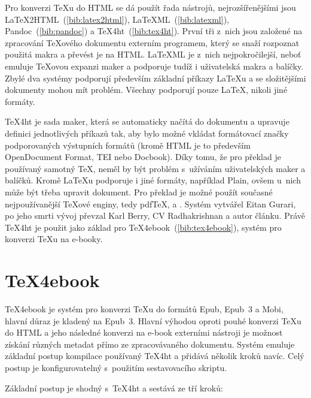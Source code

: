\documentclass{csbulletin}
\renewcommand\cite[1]{(\ref{#1})}
\begin{document}
Pro konverzi \TeX u do HTML se dá použít řada nástrojů, nejrozšířenějšími jsou
LaTeX2HTML~\cite{bib:latex2html},
LaTeXML~\cite{bib:latexml},
Pandoc~\cite{bib:pandoc} a
\TeX{}4ht~\cite{bib:tex4ht}. První tři z~nich jsou založené na
zpracování \TeX ového dokumentu externím programem, který se snaží rozpoznat
použitá makra a převést je na HTML. LaTeXML je z~nich nejpokročilejší, neboť 
emuluje \TeX ovou expanzi maker a podporuje tudíž i uživatelská makra a
balíčky. Zbylé dva systémy podporují především základní příkazy \LaTeX u a se
složitějšími dokumenty mohou mít problém. Všechny podporují pouze \LaTeX,
nikoli jiné formáty. 

\TeX{}4ht je sada maker, která se automaticky načítá do dokumentu a upravuje
definici jednotlivých příkazů tak, aby bylo možné vkládat formátovací značky
podporovaných výstupních formátů (kromě HTML je to především OpenDocument
Format, TEI nebo Docbook). Díky tomu, že pro překlad je používaný samotný \TeX,
neměl by být problém s~užíváním uživatelských maker a balíčků. Kromě \LaTeX u
podporuje i jiné formáty, například Plain, ovšem u~nich může být třeba upravit
dokument. Pro překlad je možné použít současné nejpoužívanější \TeX ové enginy,
tedy pdf\TeX, \XeTeX a \LuaTeX. Systém vytvářel Eitan Gurari, po jeho smrti
vývoj převzal Karl Berry, CV Radhakrishnan a autor článku. Právě \TeX{}4ht je
použit jako základ pro \TeX{}4ebook~\cite{bib:tex4ebook},
systém pro konverzi \TeX u na e-booky.

\section{\TeX{}4ebook}

\TeX{}4ebook je systém pro konverzi \TeX u do formátů Epub, Epub~3 a Mobi, hlavní
důraz je kladený na Epub~3. Hlavní výhodou oproti pouhé konverzi \TeX u do HTML
a jeho následné konverzi na e-book externími nástroji je možnost získání
různých metadat přímo ze zpracovávaného dokumentu. Systém emuluje základní
postup kompilace používaný \TeX{}4ht a přidává několik kroků navíc. Celý postup je
konfigurovatelný s~použitím sestavovacího skriptu.

Základní postup je shodný s~\TeX{}4ht a sestává ze tří kroků:
\end{document}
